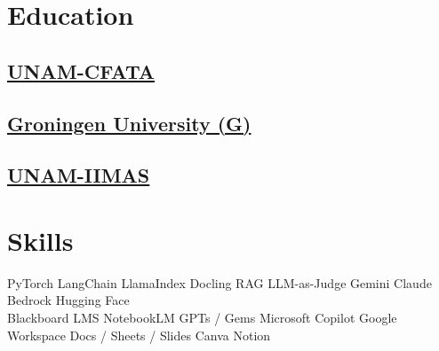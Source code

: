 \documentclass{tex/deedy-resume-openfont}
\begin{document}
\begin{minipage}[t]{0.32\textwidth} 


\section{Education} 

\subsection{\href{http://www.fata.unam.mx/}{UNAM-CFATA}}
\sectionsep

\subsection{\href{https://www.rug.nl/research/bernoulli/}{Groningen University (G)}}
\sectionsep

\subsection{\href{https://www.iimas.unam.mx/}{UNAM-IIMAS}}
\sectionsep


\section{Skills}

PyTorch \textbullet{} 
LangChain \textbullet{} 
LlamaIndex \textbullet{} 
Docling \textbullet{} 
RAG \textbullet{} 
LLM-as-Judge \textbullet{} 
Gemini \textbullet{} 
Claude \textbullet{} 
Bedrock \textbullet{} 
Hugging Face \\[4pt]

Blackboard \textbullet{} 
LMS \textbullet{} 
NotebookLM \textbullet{} 
GPTs / Gems \textbullet{} 
Microsoft Copilot \textbullet{} 
Google Workspace \textbullet{} 
Docs / Sheets / Slides \textbullet{} 
Canva \textbullet{} 
Notion \\[4pt]


\end{minipage}
\end{document}

